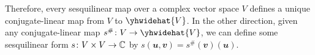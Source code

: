 \documentclass[math, code]{amznotes}
\makeatletter
\let\save@mathaccent\mathaccent
\newcommand*\if@single[3]{%
  \setbox0\hbox{${\mathaccent"0362{#1}}^H$}%
  \setbox2\hbox{${\mathaccent"0362{\kern0pt#1}}^H$}%
  \ifdim\ht0=\ht2 #3\else #2\fi
  }
\newcommand*\rel@kern[1]{\kern#1\dimexpr\macc@kerna}
\newcommand*\widebar[1]{\@ifnextchar^{{\wide@bar{#1}{0}}}{\wide@bar{#1}{1}}}
\newcommand*\wide@bar[2]{\if@single{#1}{\wide@bar@{#1}{#2}{1}}{\wide@bar@{#1}{#2}{2}}}
\newcommand*\wide@bar@[3]{%
  \begingroup
  \def\mathaccent##1##2{%
    \let\mathaccent\save@mathaccent
    \if#32 \let\macc@nucleus\first@char \fi
    \setbox\z@\hbox{$\macc@style{\macc@nucleus}_{}$}%
    \setbox\tw@\hbox{$\macc@style{\macc@nucleus}{}_{}$}%
    \dimen@\wd\tw@
    \advance\dimen@-\wd\z@
    \divide\dimen@ 3
    \@tempdima\wd\tw@
    \advance\@tempdima-\scriptspace
    \divide\@tempdima 10
    \advance\dimen@-\@tempdima
    \ifdim\dimen@>\z@ \dimen@0pt\fi
    \rel@kern{0.6}\kern-\dimen@
    \if#31
      \overline{\rel@kern{-0.6}\kern\dimen@\macc@nucleus\rel@kern{0.4}\kern\dimen@}%
      \advance\dimen@0.4\dimexpr\macc@kerna
      \let\final@kern#2%
      \ifdim\dimen@<\z@ \let\final@kern1\fi
      \if\final@kern1 \kern-\dimen@\fi
    \else
      \overline{\rel@kern{-0.6}\kern\dimen@#1}%
    \fi
  }%
  \macc@depth\@ne
  \let\math@bgroup\@empty \let\math@egroup\macc@set@skewchar
  \mathsurround\z@ \frozen@everymath{\mathgroup\macc@group\relax}%
  \macc@set@skewchar\relax
  \let\mathaccentV\macc@nested@a
  \if#31
    \macc@nested@a\relax111{#1}%
  \else
    \def\gobble@till@marker##1\endmarker{}%
    \futurelet\first@char\gobble@till@marker#1\endmarker
    \ifcat\noexpand\first@char A\else
      \def\first@char{}%
    \fi
    \macc@nested@a\relax111{\first@char}%
  \fi
  \endgroup
}
\theoremstyle{remark}
\makeatother
\begin{document}
    Therefore, every sesquilinear map over a complex vector space $V$ defines a unique conjugate-linear map from $V$ to $\yhwidehat{V}$. In the other direction, given any conjugate-linear map $s^{\#} \colon V \to \yhwidehat{V}$, we can define some sesquilinear form $s \colon V \times V \to \mathbb{C}$ by $s(\mathbfit{u}, \mathbfit{v}) = s^{\#}(\mathbfit{v})(\mathbfit{u})$.
\end{document}
